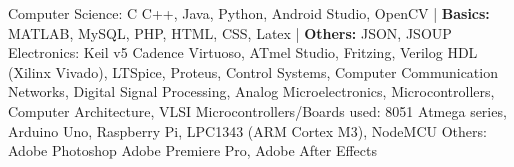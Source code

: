 \begin{cvhonors}
  \cvhonor
    {Computer Science: \textmd{C}}
    {C++, Java, Python, Android Studio, OpenCV | \textbf{Basics:} MATLAB, MySQL, PHP, HTML, CSS, Latex | \textbf{Others:}  JSON, JSOUP}
    {}
    {}
  \cvhonor
    {Electronics:  \textmd{Keil v5}}
    {Cadence Virtuoso, ATmel Studio, Fritzing, Verilog HDL (Xilinx Vivado), LTSpice, Proteus, Control Systems, Computer Communication Networks, Digital Signal Processing, Analog Microelectronics, Microcontrollers, Computer Architecture, VLSI}
    {}
     {}
     \cvhonor
    {Microcontrollers/Boards used:  \textmd{8051}}
    {Atmega series, Arduino Uno, Raspberry Pi, LPC1343 (ARM Cortex M3), NodeMCU}
    {}
     {}
     \cvhonor
    {Others: \textmd{Adobe Photoshop}}
    {Adobe Premiere Pro, Adobe After Effects}
    {}
    {}
\end{cvhonors}
